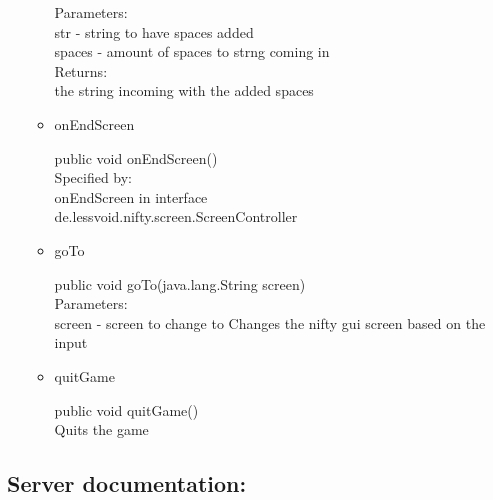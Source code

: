 \documentclass[letterpaper]{article}
\begin{document}
\begin{itemize}
\begin{itemize}
    Parameters: \\
        str - string to have spaces added \\
        spaces - amount of spaces to strng coming in \\
    Returns: \\
        the string incoming with the added spaces \\
        
    \item onEndScreen

    public void onEndScreen() \\

    Specified by: \\
        onEndScreen in interface \\ de.lessvoid.nifty.screen.ScreenController

    \item goTo

    public void goTo(java.lang.String screen) \\

    Parameters: \\
        screen - screen to change to Changes the nifty gui screen based on the input \\

    \item quitGame

    public void quitGame() \\

    Quits the game \\




										\end{itemize}
							\end{itemize}
					
					\vspace{0.2in}
					\subsection*{Server documentation:}
					\vspace{0.1in}
					
\end{document}
